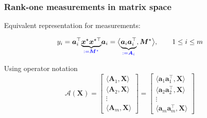 \documentclass[compress,
mathserif,wide,%
]{beamer}
\begin{document}
\begin{frame}
\frametitle{Rank-one measurements in matrix space} 

Equivalent representation for measurements: 

\[
y_{i}=\bm{a}_{i}^{\top}\underset{\textcolor{blue}{ :=\bm{M}^\star}}{\underbrace{\bm{x}^\star \bm{x}^{\star \top}}}\bm{a}_{i}
= \big\langle \underset{\textcolor{blue}{ :=\bm{A}_{i}}}{\underbrace{\bm{a}_{i}\bm{a}_{i}^{\top}}},\bm{M}^\star \big\rangle , 
\qquad 1 \leq i \leq m
\]

\vfill
Using operator notation
\[
\mathcal{A}\left(\bm{X}\right)=\left[\begin{array}{c}
\langle\bm{A}_{1},\bm{X}\rangle\\
\langle\bm{A}_{2},\bm{X}\rangle\\
\vdots\\
\langle\bm{A}_{m},\bm{X}\rangle
\end{array}\right]=\left[\begin{array}{c}
\langle\bm{a}_{1}\bm{a}_{1}^{\top},\bm{X}\rangle\\
\langle\bm{a}_{2}\bm{a}_{2}^{\top},\bm{X}\rangle\\
\vdots\\
\langle\bm{a}_{m}\bm{a}_{m}^{\top},\bm{X}\rangle
\end{array}\right]
\]


\end{frame}
\end{document}
